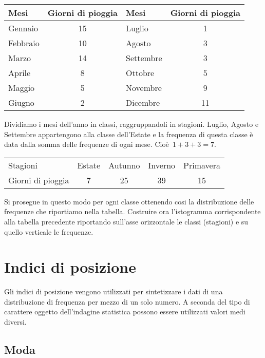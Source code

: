 \begin{exrig}
\begin{esempio}
\begin{center}
\begin{tabular}{lclc}
\toprule
Mesi & Giorni di pioggia &Mesi & Giorni di pioggia\\
\midrule
Gennaio & 15&Luglio & 1 \\
Febbraio & 10 &Agosto & 3\\
Marzo & 14 &Settembre & 3\\
Aprile & 8 &Ottobre & 5\\
Maggio & 5 &Novembre & 9\\
Giugno & 2 &Dicembre & 11\\
\bottomrule
\end{tabular}
\end{center}
Dividiamo i mesi dell'anno in classi, raggruppandoli in stagioni. Luglio, Agosto e Settembre
appartengono alla classe dell'Estate e la frequenza di questa classe è data dalla somma delle frequenze di ogni mese.
Cioè~$1 + 3 + 3 = 7$.
\begin{center}
\begin{tabular}{lcccc}
\toprule
Stagioni & Estate & Autunno & Inverno& Primavera\\
Giorni di pioggia & 7 & 25 & 39 & 15 \\
\bottomrule
\end{tabular}
\end{center}
Si prosegue in questo modo per ogni classe ottenendo cosi la distribuzione delle frequenze che riportiamo nella tabella.
Costruire ora l'istogramma corrispondente alla tabella precedente riportando sull'asse orizzontale le classi (stagioni) e su quello verticale le frequenze.
 \end{esempio}
\end{exrig}


\section{Indici di posizione}
\label{sec:A_medie}

Gli indici di posizione vengono utilizzati per sintetizzare i dati di una distribuzione di frequenza per mezzo di un solo numero.
A seconda del tipo di carattere oggetto dell'indagine statistica possono essere utilizzati valori medi diversi.

\subsection{Moda}

